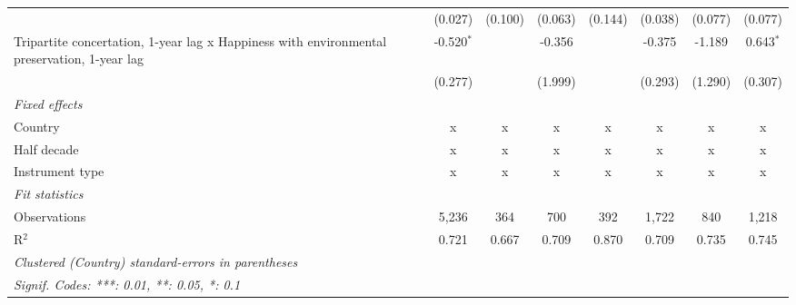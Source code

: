 \begin{table}[htbp]
\begin{tabular}{lccccccc}
                                                                                                  & (0.027)       & (0.100)                   & (0.063)        & (0.144)          & (0.038)         & (0.077)         & (0.077)\\   
      Tripartite concertation, 1-year lag x Happiness with environmental preservation, 1-year lag & -0.520$^{*}$  &                           & -0.356         &                  & -0.375          & -1.189          & 0.643$^{*}$\\   
                                                                                                  & (0.277)       &                           & (1.999)        &                  & (0.293)         & (1.290)         & (0.307)\\   
      \emph{Fixed effects}\\
      Country                                                                                     & x             & x                         & x              & x                & x               & x               & x\\  
      Half decade                                                                                 & x             & x                         & x              & x                & x               & x               & x\\  
      Instrument type                                                                             & x             & x                         & x              & x                & x               & x               & x\\  
      \midrule \emph{Fit statistics}\\
      Observations                                                                                & 5,236         & 364                       & 700            & 392              & 1,722           & 840             & 1,218\\  
      R$^2$                                                                                       & 0.721         & 0.667                     & 0.709          & 0.870            & 0.709           & 0.735           & 0.745\\  
      \midrule
      \multicolumn{8}{l}{\emph{Clustered (Country) standard-errors in parentheses}}\\
      \multicolumn{8}{l}{\emph{Signif. Codes: ***: 0.01, **: 0.05, *: 0.1}}\\
   \end{tabular}
\end{table}


